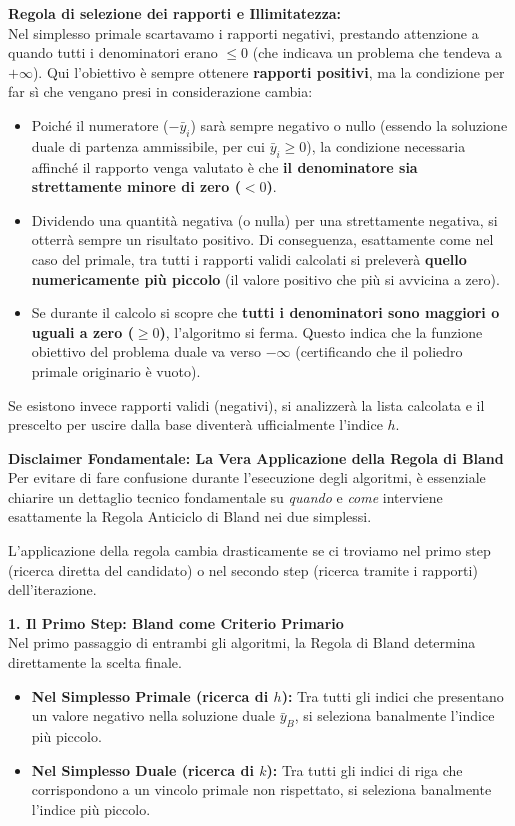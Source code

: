 \documentclass[12pt, a4paper]{article}
\begin{document}
	\textbf{Regola di selezione dei rapporti e Illimitatezza:}\\
	Nel simplesso primale scartavamo i rapporti negativi, prestando attenzione a quando tutti i denominatori erano $\leq 0$ (che indicava un problema che tendeva a $+\infty$). 
	Qui l'obiettivo è sempre ottenere \textbf{rapporti positivi}, ma la condizione per far sì che vengano presi in considerazione cambia:
	\begin{itemize}
		\item Poiché il numeratore ($-\bar{y}_i$) sarà sempre negativo o nullo (essendo la soluzione duale di partenza ammissibile, per cui $\bar{y}_i \geq 0$), la condizione necessaria affinché il rapporto venga valutato è che \textbf{il denominatore sia strettamente minore di zero ($< 0$)}.
		\item Dividendo una quantità negativa (o nulla) per una strettamente negativa, si otterrà sempre un risultato positivo. Di conseguenza, esattamente come nel caso del primale, tra tutti i rapporti validi calcolati si preleverà \textbf{quello numericamente più piccolo} (il valore positivo che più si avvicina a zero).
		\item Se durante il calcolo si scopre che \textbf{tutti i denominatori sono maggiori o uguali a zero ($\geq 0$)}, l'algoritmo si ferma. Questo indica che la funzione obiettivo del problema duale va verso $-\infty$ (certificando che il poliedro primale originario è vuoto).
	\end{itemize}
	
	Se esistono invece rapporti validi (negativi), si analizzerà la lista calcolata e il prescelto per uscire dalla base diventerà ufficialmente l'indice \textbf{$h$}.
	
	\vspace{0.6cm}
	\textbf{Disclaimer Fondamentale: La Vera Applicazione della Regola di Bland}\\
	Per evitare di fare confusione durante l'esecuzione degli algoritmi, è essenziale chiarire un dettaglio tecnico fondamentale su \textit{quando} e \textit{come} interviene esattamente la Regola Anticiclo di Bland nei due simplessi. 
	
	L'applicazione della regola cambia drasticamente se ci troviamo nel primo step (ricerca diretta del candidato) o nel secondo step (ricerca tramite i rapporti) dell'iterazione.
	
	\vspace{0.3cm}
	\textbf{1. Il Primo Step: Bland come Criterio Primario}\\
	Nel primo passaggio di entrambi gli algoritmi, la Regola di Bland determina direttamente la scelta finale.
	\begin{itemize}[label=\textcolor{titlecolor}{\Large\textbullet}, itemsep=2pt, leftmargin=1.5cm]
		\item \textbf{Nel Simplesso Primale (ricerca di $h$):} Tra tutti gli indici che presentano un valore negativo nella soluzione duale $\bar{y}_B$, si seleziona banalmente l'indice più piccolo.
		\item \textbf{Nel Simplesso Duale (ricerca di $k$):} Tra tutti gli indici di riga che corrispondono a un vincolo primale non rispettato, si seleziona banalmente l'indice più piccolo.
	\end{itemize}
	
\end{document}
